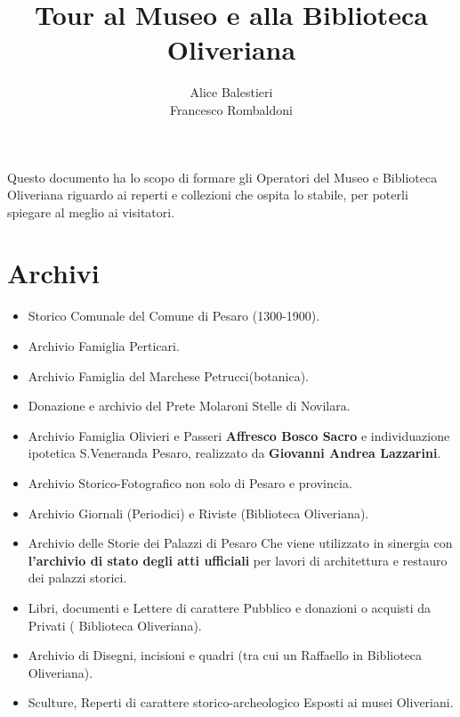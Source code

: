 \documentclass[hidelinks,12pt,a4paper]{article}
\begin{document}
	\begin{flushleft}
		
		\title{\textbf{Tour al Museo e alla Biblioteca Oliveriana}}
		\author{Alice Balestieri\\Francesco Rombaldoni}
		\date{} 
		 
	  	\maketitle
	    
		\setcounter{page}{1}
		\newpage
		Questo documento ha lo scopo di formare gli Operatori del Museo e Biblioteca Oliveriana riguardo ai reperti e collezioni che ospita lo stabile, per poterli spiegare al meglio ai visitatori.
		\newpage
		\tableofcontents
		\newpage
	
		\section{Archivi}
				
		\begin{itemize}
			\item Storico Comunale del Comune di Pesaro (1300-1900).
			\item Archivio Famiglia Perticari.
			\item Archivio Famiglia del Marchese Petrucci(botanica).
			\item Donazione e archivio del Prete Molaroni \textrightarrow Stelle di Novilara.
			\item Archivio Famiglia Olivieri e Passeri \textrightarrow \textbf{Affresco Bosco Sacro} e individuazione ipotetica S.Veneranda Pesaro, realizzato da \textbf{Giovanni Andrea Lazzarini}.
			\item Archivio Storico-Fotografico non solo di Pesaro e provincia.
			\item Archivio Giornali (Periodici) e Riviste (Biblioteca Oliveriana).
			\item Archivio delle Storie dei Palazzi di Pesaro \textrightarrow Che viene utilizzato in sinergia con \textbf{l'archivio di stato degli atti ufficiali} per lavori di architettura e restauro dei palazzi storici.
			\item Libri, documenti e Lettere di carattere Pubblico e donazioni o acquisti da Privati ( Biblioteca Oliveriana).
			\item Archivio di Disegni, incisioni e quadri (tra cui un Raffaello in Biblioteca Oliveriana).
		\item Sculture, Reperti di carattere storico-archeologico \textrightarrow Esposti ai musei Oliveriani.			
		\end{itemize}
	

\end{flushleft}
\end{document}
